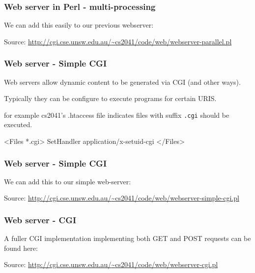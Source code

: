 \begin{frame}[fragile]
\frametitle{Web server in Perl - multi-processing}

We can add this easily to our previous webserver:

{\tiny Source:  \href{http://cgi.cse.unsw.edu.au/~cs2041/code/web/webserver-parallel.pl}{http://cgi.cse.unsw.edu.au/{\textasciitilde}cs2041/code/web/webserver-parallel.pl}}
\end{frame}

\begin{frame}[fragile]
\frametitle{Web server - Simple CGI}
Web servers allow dynamic content to be generated via CGI (and other ways).

Typically they can be configure to execute programs for certain URIS.

for example cs2041's .htaccess file indicates files with suffix {\tt .cgi} should be executed.

\begin{txt}
<Files *.cgi>
SetHandler application/x-setuid-cgi
</Files>
\end{txt}
\end{frame}

\begin{frame}[fragile]
\frametitle{Web server - Simple CGI}

We can add this to our simple web-server:
 
{\tiny Source:  \href{http://cgi.cse.unsw.edu.au/~cs2041/code/web/webserver-simple-cgi.pl}{http://cgi.cse.unsw.edu.au/{\textasciitilde}cs2041/code/web/webserver-simple-cgi.pl}}
\end{frame}

\begin{frame}[fragile]
\frametitle{Web server - CGI}

A fuller CGI implementation implementing both GET and POST requests can be found here:

{\tiny Source:  \href{http://cgi.cse.unsw.edu.au/~cs2041/code/web/webserver-cgi.pl}{http://cgi.cse.unsw.edu.au/{\textasciitilde}cs2041/code/web/webserver-cgi.pl}}
\end{frame}

